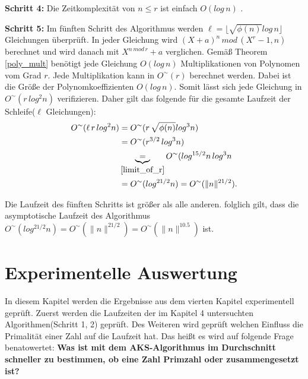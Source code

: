 \documentclass[12pt,oneside]{article}
\theoremstyle{remark}
\theoremstyle{definition}
\begin{document}
\textbf{Schritt 4:}\newline
Die Zeitkomplexität von $n \leq r$ ist einfach $O(log \, n)$ \cite{computer-algebra}.

\textbf{Schritt 5:}\newline
Im fünften Schritt des Algorithmus werden $\ell = \lfloor \sqrt{\phi(n)} log \, n \rfloor$ Gleichungen überprüft. In jeder Gleichung wird $(X + a)^n \, mod \, (X^r - 1,n)$ berechnet und wird danach mit $X^{n \, mod \, r} + a$ verglichen. Gemäß Theorem \ref{poly_mult} benötigt jede Gleichung $O(log \, n)$ Multiplikationen von Polynomen vom Grad $r$. Jede Multiplikation kann in $O^{\sim}(r)$ berechnet werden. Dabei ist die Größe der Polynomkoeffizienten $O(log \, n)$. Somit lässt sich jede Gleichung in $O^{\sim}(r \, log^2n)$ verifizieren. Daher gilt das folgende für die gesamte Laufzeit der Schleife($\ell$ Gleichungen):\newline
\begin{align*}
    O^{\sim}(\ell \, r \, log^2n) &= O^{\sim}(r \, \sqrt{\phi(n)} log^3 n)  \\
    &= O^{\sim}(r^{3/2} \, log^3 n) \\
    &\underbrace{=}_{\ref{limit_of_r}} O^{\sim}(log^{15/2}n \, log^3n \\ 
    &=O^{\sim}(log^{21/2}n) = O^{\sim}( \lVert n \rVert^{21/2}).
\end{align*}

Die Laufzeit des fünften Schritts ist größer als alle anderen. folglich gilt, dass die asymptotische Laufzeit des Algorithmus $O^{\sim}(log^{21/2}n) = O^{\sim}( \lVert n \rVert^{21/2}) = O^{\sim}(\lVert n \rVert^{10.5})$ ist.\newline


\newpage

\section{Experimentelle Auswertung}
In diesem Kapitel werden die Ergebnisse aus dem vierten Kapitel experimentell geprüft. Zuerst werden die Laufzeiten der im Kapitel 4 untersuchten Algorithmen(Schritt 1, 2) geprüft. Des Weiteren wird geprüft welchen Einfluss die Primalität einer Zahl auf die Laufzeit hat. Das heißt es wird auf folgende Frage benatowertet:\newline
\textbf{Was ist mit dem AKS-Algorithmus im Durchschnitt schneller zu bestimmen, ob eine Zahl Primzahl oder zusammengesetzt ist?}
\end{document}
